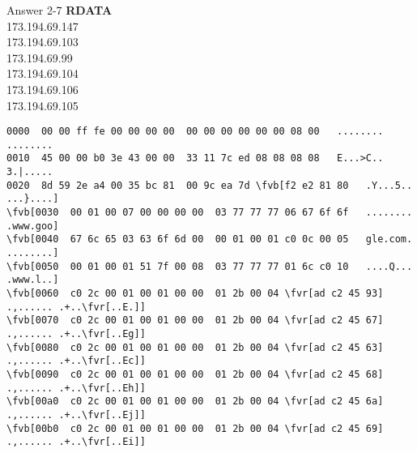 \documentclass{beamer}
\newcommand*{\fvr}[1]{\textcolor{red}{#1}}
\newcommand*{\fvb}[1]{\textcolor{blue}{#1}}
\begin{document}
  \begin{frame}[fragile]{\mytitle}{Answer 2-7}
    \textbf{RDATA}\\
    173.194.69.147 \\
    173.194.69.103 \\
    173.194.69.99  \\
    173.194.69.104 \\
    173.194.69.106 \\
    173.194.69.105 \\
    \tiny
    \begin{Verbatim}[commandchars=\\\[\]]
0000  00 00 ff fe 00 00 00 00  00 00 00 00 00 00 08 00   ........ ........
0010  45 00 00 b0 3e 43 00 00  33 11 7c ed 08 08 08 08   E...>C.. 3.|.....
0020  8d 59 2e a4 00 35 bc 81  00 9c ea 7d \fvb[f2 e2 81 80   .Y...5.. ...}....]
\fvb[0030  00 01 00 07 00 00 00 00  03 77 77 77 06 67 6f 6f   ........ .www.goo]
\fvb[0040  67 6c 65 03 63 6f 6d 00  00 01 00 01 c0 0c 00 05   gle.com. ........]
\fvb[0050  00 01 00 01 51 7f 00 08  03 77 77 77 01 6c c0 10   ....Q... .www.l..]
\fvb[0060  c0 2c 00 01 00 01 00 00  01 2b 00 04 \fvr[ad c2 45 93]   .,...... .+..\fvr[..E.]]
\fvb[0070  c0 2c 00 01 00 01 00 00  01 2b 00 04 \fvr[ad c2 45 67]   .,...... .+..\fvr[..Eg]]
\fvb[0080  c0 2c 00 01 00 01 00 00  01 2b 00 04 \fvr[ad c2 45 63]   .,...... .+..\fvr[..Ec]]
\fvb[0090  c0 2c 00 01 00 01 00 00  01 2b 00 04 \fvr[ad c2 45 68]   .,...... .+..\fvr[..Eh]]
\fvb[00a0  c0 2c 00 01 00 01 00 00  01 2b 00 04 \fvr[ad c2 45 6a]   .,...... .+..\fvr[..Ej]]
\fvb[00b0  c0 2c 00 01 00 01 00 00  01 2b 00 04 \fvr[ad c2 45 69]   .,...... .+..\fvr[..Ei]]
    \end{Verbatim}
\end{frame}

  \appendix{}
  \setcounter{finalframe}{\value{framenumber}}
  \pagestyle{empty}
  \renewcommand{\mytitle}{Literaturverzeichnis}
  \frame[allowframebreaks]{\frametitle{\mytitle}
   
    
  }
  \setcounter{framenumber}{\value{finalframe}}
\end{document}
